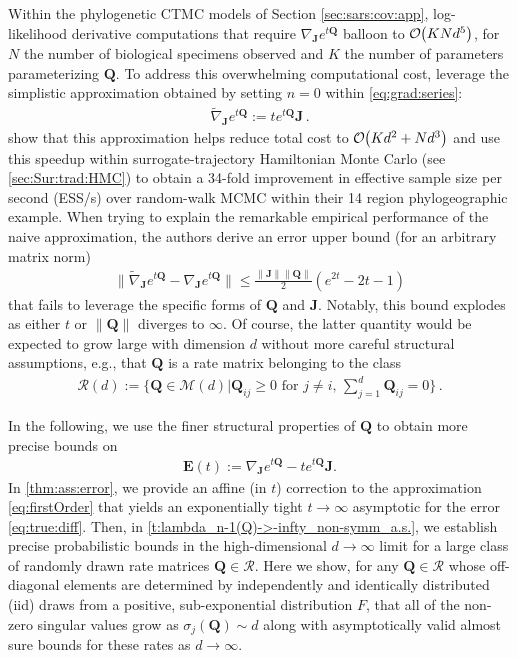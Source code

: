 \documentclass[9pt,twocolumn,twoside]{pnas-new}
\newcommand{\order}[1]{{\cal O}\hspace{-0.2em}\left( #1 \right)}
\newcommand{\?}{\textbf{?}}
\newcommand{\QQ}{\mathbf{Q}}
\newcommand{\JJ}{\mathbf{J}}
\newcommand{\Z}{\mathbf{E}}
\begin{document}
Within the phylogenetic CTMC models of Section \ref{sec:sars:cov:app}, log-likelihood derivative computations that require $\nabla_{\JJ} e^{t \QQ}$ balloon to $\order{KNd^5}$, for $N$ the number of biological specimens observed and $K$ the number of parameters parameterizing $\QQ$.
To address this overwhelming computational cost, \cite{magee2023random} leverage
the simplistic approximation obtained by setting $n=0$ within \eqref{eq:grad:series}:
\begin{align}\label{eq:firstOrder}
	\widetilde{\nabla}_{\JJ} e^{t\QQ} := t e^{t\QQ}\JJ   \, .
\end{align}
\cite{magee2023random} show that this approximation helps reduce total cost to $\order{Kd^2 + Nd^3}$ and use this speedup within
surrogate-trajectory Hamiltonian Monte Carlo (see \cref{sec:Sur:trad:HMC}) 
to obtain a
34-fold improvement in effective sample size per second (ESS/s) over
random-walk MCMC within their 14 region phylogeographic example.
When trying to explain the remarkable empirical performance of the naive
approximation, the authors derive an error upper
bound (for an arbitrary matrix norm)
\begin{align}\label{eq:initial:bnd}
  \lVert \widetilde{\nabla}_{\JJ}e^{t \QQ}  - \nabla_{\JJ} e^{t \QQ} \rVert
  \leq \frac{ \| \JJ \| \lVert\QQ \rVert }{2} (e^{2t} -2t-1) 
\end{align}
that fails to leverage the specific forms of $\QQ$ and $\JJ$.
Notably, this bound explodes as either $t$ or $\lVert \QQ \rVert$
diverges to $\infty$.  Of course, the latter quantity would be
expected to grow large with dimension $d$ without more careful
structural assumptions, e.g., that $\QQ$ is a rate matrix belonging to
the class
\begin{align}\label{eq:rate:mat}
  \mathcal{R}(d) :=
  \Big\{ \QQ \in {\mathcal M}(d) |
  \QQ_{ij} \geq 0 \text{ for } j \not= i ,\, \sum_{j =1}^d \QQ_{ij} = 0 \Big\} \, .
\end{align}

In the following, we use the finer structural properties of $\QQ$ to
obtain more precise bounds on
\begin{align}\label{eq:true:diff}
  \Z(t) := \nabla_\JJ e^{t \QQ} - t e^{t \QQ} \JJ.
\end{align}
In \cref{thm:ass:error}, we provide an affine (in $t$) correction to the 
approximation \eqref{eq:firstOrder} that yields an exponentially tight 
$t \to \infty$ asymptotic for the error \eqref{eq:true:diff}. Then, in 
\cref{t:lambda_n-1(Q)->-infty_non-symm_a.s.}, we establish
precise probabilistic bounds in the high-dimensional $d \to \infty$
limit for a large class of randomly drawn rate matrices
$\QQ \in \mathcal{R}$.  Here we show, for any $\QQ \in \mathcal{R}$
whose off-diagonal elements are determined by independently and identically distributed (iid) draws from a
positive, sub-exponential distribution $F$, that all of the non-zero
singular values grow as $\sigma_j(\QQ) \sim d$ along with
asymptotically valid almost sure bounds for these rates as
$d \to \infty$. 
\end{document}
